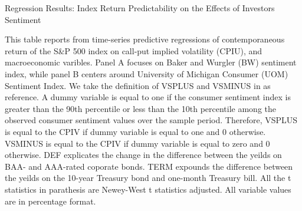 \begin{table}[h]

\caption{Regression Results: Index Return Predictability on the Effects of Investors Sentiment}\label{table:sentiment}
\begin{threeparttable}

\medskip

{\scriptsize 
This table reports from time-series predictive regressions of contemporaneous return of the S\&P 500 index on call-put implied volatility (CPIU), and macroeconomic varibles. Panel A focuses on Baker and Wurgler (BW) sentiment index, while panel B centers around University of Michigan Consumer (UOM) Sentiment Index. We take the definition of VSPLUS and VSMINUS in \textcite{atilgan2015implied} as reference. A dummy variable is equal to one if the consumer sentiment index is greater than the 90th percentile or less than the 10th percentile among the observed consumer sentiment values over the sample period. Therefore, VSPLUS is equal to the CPIV if dummy variable is equal to one and 0 otherwise. VSMINUS is equal to the CPIV if dummy variable is equal to zero and 0 otherwise. DEF explicates the change in the difference between the yeilds on BAA- and AAA-rated coporate bonds. TERM expounds the difference between the yeilds on the 10-year Treasury bond and one-month Treasury bill. All the t statistics in parathesis are Newey-West t statistics adjusted. All variable values are in percentage format.  
}
\medskip


\begin{subtable}[t]{\linewidth}


\end{subtable}
\end{threeparttable}
\end{table}
